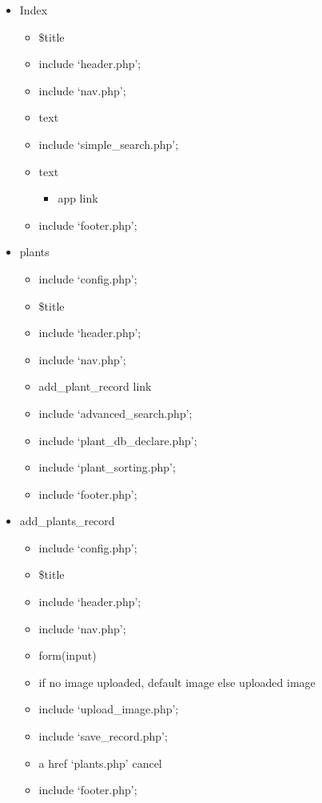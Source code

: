 \begin{itemize}
		\item Index
		\begin{itemize}
			\item \$title
			\item include `header.php';
			\item include `nav.php';
			\item text
			\item include `simple\_search.php';
			\item text
			\begin{itemize}
				\item app link
			\end{itemize}
			\item include `footer.php';
		\end{itemize}	

		\item plants
		\begin{itemize}
			\item include `config.php';
			\item \$title
			\item include `header.php';
			\item include `nav.php';
			\item add\_plant\_record link
			\item include `advanced\_search.php';
			\item include `plant\_db\_declare.php';
			\item include `plant\_sorting.php';
			\item include `footer.php';
		\end{itemize}
		\item add\_plants\_record
		\begin{itemize}
			\item include `config.php';
			\item \$title
			\item include `header.php';
			\item include `nav.php';
			\item form(input)
			\item if no image uploaded, default image else uploaded image
			\item include `upload\_image.php';
			\item include `save\_record.php';
			\item a href `plants.php' cancel
			\item include `footer.php';
		\end{itemize}
		

\end{itemize}

